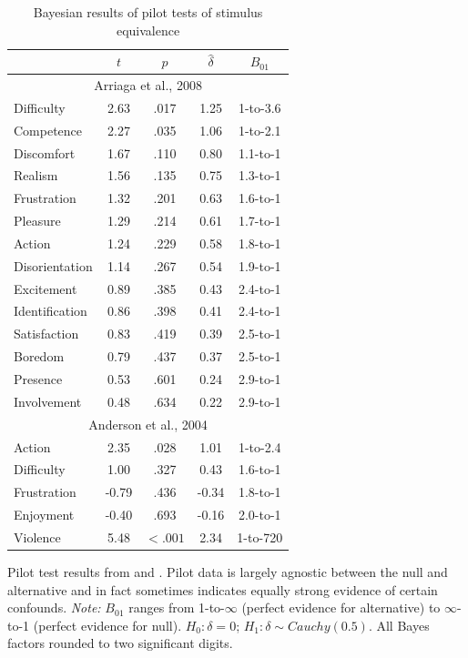 \documentclass[man]{apa6}
\begin{document}
\begin{singlespace}
\begin{table}
\caption{Bayesian results of pilot tests of stimulus equivalence}
\begin{center}
\begin{tabular}{lcccc} 
&$t$&$p$&$\hat{\delta}$&$B_{01}$ \\ \hline
\multicolumn{5}{c}{Arriaga et al., 2008} \\
Difficulty&2.63&.017&1.25&1-to-3.6 \\
Competence&2.27&.035&1.06&1-to-2.1 \\
Discomfort&1.67&.110&0.80&1.1-to-1 \\ 
Realism&1.56&.135&0.75&1.3-to-1 \\
Frustration&1.32&.201&0.63&1.6-to-1 \\
Pleasure&1.29&.214&0.61&1.7-to-1 \\
Action&1.24&.229&0.58&1.8-to-1 \\
Disorientation&1.14&.267&0.54&1.9-to-1 \\ 
Excitement&0.89&.385&0.43&2.4-to-1 \\
Identification&0.86&.398&0.41&2.4-to-1 \\
Satisfaction&0.83&.419&0.39&2.5-to-1 \\ 
Boredom&0.79&.437&0.37&2.5-to-1 \\ 
Presence&0.53&.601&0.24&2.9-to-1 \\
Involvement&0.48&.634&0.22&2.9-to-1 \\
\multicolumn{5}{c}{Anderson et al., 2004}\\
Action&2.35&.028&1.01&1-to-2.4 \\
Difficulty&1.00&.327&0.43&1.6-to-1 \\
Frustration&-0.79&.436&-0.34&1.8-to-1 \\
Enjoyment&-0.40&.693&-0.16&2.0-to-1 \\
Violence&5.48&$<.001$&2.34&1-to-720 \\ \hline
\end{tabular}
\end{center}

\vspace{4mm}
Pilot test results from \citet{Arriaga:etal:2008} and \citet{Anderson:etal:2004}. Pilot data is largely agnostic between the null and alternative and in fact sometimes indicates equally strong evidence of certain confounds. {\em Note:} $B_{01}$ ranges from 1-to-$\infty$ (perfect evidence for alternative) to $\infty$-to-1 (perfect evidence for null). $H_0: \delta = 0$; $H_1: \delta \sim Cauchy(0.5)$. All Bayes factors rounded to two significant digits.
\label{ArriagaAndersonPilot}
\end{table}
\end{singlespace}
\end{document}
